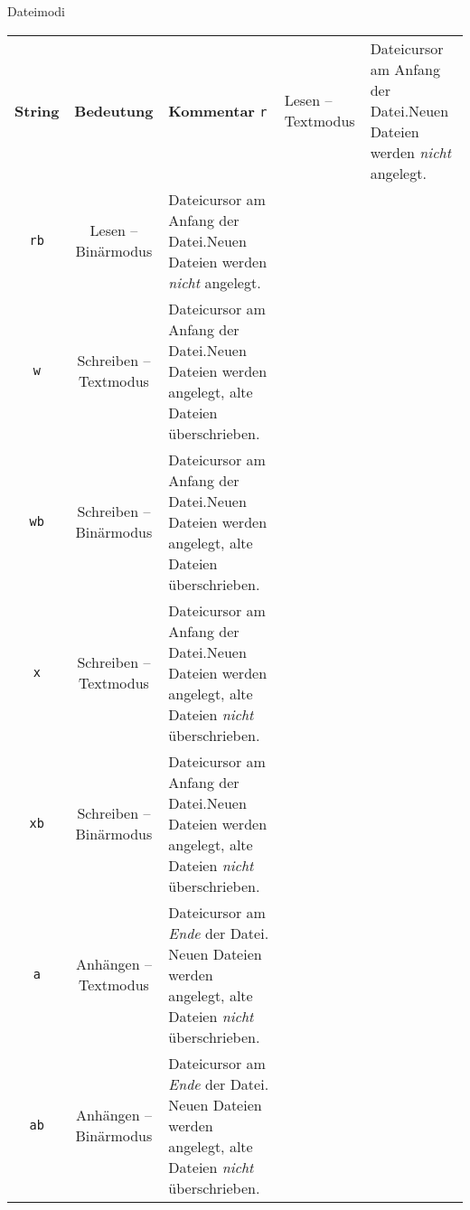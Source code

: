 \begin{frame}[fragile]{Dateimodi}
%
\begin{center}
\scriptsize
{}
\begin{tabular}{c|cp{.6\linewidth}}
	\toprule
	\textbf{String}	& \textbf{Bedeutung}				& \textbf{Kommentar} \tabcrlf
	\texttt{r}				& Lesen -- Textmodus				& Dateicursor am Anfang der Datei.\newline Neuen Dateien werden \emph{nicht} angelegt.\\
	\texttt{rb}			& Lesen -- Binärmodus			& Dateicursor am Anfang der Datei.\newline Neuen Dateien werden \emph{nicht} angelegt.\\
	\texttt{w}				& Schreiben -- Textmodus		& Dateicursor am Anfang der Datei.\newline Neuen Dateien werden angelegt, alte Dateien überschrieben.\\
	\texttt{wb}			& Schreiben -- Binärmodus	& Dateicursor am Anfang der Datei.\newline Neuen Dateien werden angelegt, alte Dateien überschrieben.\\
	\texttt{x}				& Schreiben -- Textmodus		& Dateicursor am Anfang der Datei.\newline Neuen Dateien werden angelegt, alte Dateien \emph{nicht} überschrieben.\\
	\texttt{xb}			& Schreiben -- Binärmodus	& Dateicursor am Anfang der Datei.\newline Neuen Dateien werden angelegt, alte Dateien \emph{nicht} überschrieben.\\
	\texttt{a}				& Anhängen -- Textmodus		& Dateicursor am \emph{Ende} der Datei. Neuen Dateien werden angelegt, alte Dateien \emph{nicht} überschrieben.\\
	\texttt{ab}			& Anhängen -- Binärmodus		& Dateicursor am \emph{Ende} der Datei. Neuen Dateien werden angelegt, alte Dateien \emph{nicht} überschrieben. \\
	\bottomrule
\end{tabular}
\end{center}
%
\end{frame}


